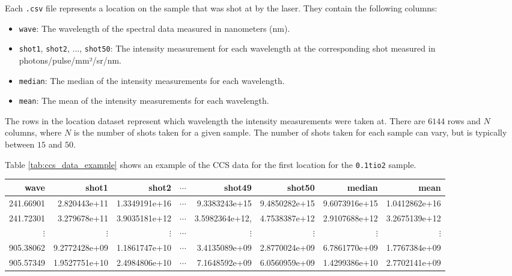 Each \texttt{.csv} file represents a location on the sample that was shot at by the laser.
They contain the following columns:

\begin{itemize}
    \item \texttt{wave}: The wavelength of the spectral data measured in nanometers (nm).
    \item \texttt{shot1}, \texttt{shot2}, ..., \texttt{shot50}: The intensity measurement for each wavelength at the corresponding shot measured in photons/pulse/mm²/sr/nm.
    \item \texttt{median}: The median of the intensity measurements for each wavelength.
    \item \texttt{mean}: The mean of the intensity measurements for each wavelength.
\end{itemize}

The rows in the location dataset represent which wavelength the intensity measurements were taken at.
There are $6144$ rows and $N$ columns, where $N$ is the number of shots taken for a given sample.
The number of shots taken for each sample can vary, but is typically between $15$ and $50$.

Table \ref{tab:ccs_data_example} shows an example of the CCS data for the first location for the \texttt{0.1tio2} sample.

\begin{table*}[ht]
\centering
\begin{tabular}{rrrrrrrr}
\toprule
     wave &        shot1 &      shot2 &      $\cdots$ &       shot49 &       shot50 & median & mean \\
\midrule
241.66901 & 2.820443e+11 & 1.3349191e+16 & $\cdots$ & 9.3383243e+15 & 9.4850282e+15 & 9.6073916e+15 & 1.0412862e+16 \\
241.72301 & 3.279678e+11 & 3.9035181e+12 & $\cdots$ & 3.5982364e+12, & 4.7538387e+12 & 2.9107688e+12 & 3.2675139e+12 \\
$\vdots$  & $\vdots$     & $\vdots$ & $\cdots$ & $\vdots$ & $\vdots$ & $\vdots$ & $\vdots$ \\
905.38062 & 9.2772428e+09 & 1.1861747e+10 & $\cdots$ & 3.4135089e+09 & 2.8770024e+09 & 6.7861770e+09 & 1.7767384e+09 \\
905.57349 & 1.9527751e+10 & 2.4984806e+10 & $\cdots$ & 7.1648592e+09 & 6.0560959e+09 & 1.4299386e+10 & 2.7702141e+09 \\ 
\bottomrule
\end{tabular}
\caption{Example of CCS data for the first sample in the \texttt{0.1tio2} directory.}
\label{tab:ccs_data_example}
\end{table*}

